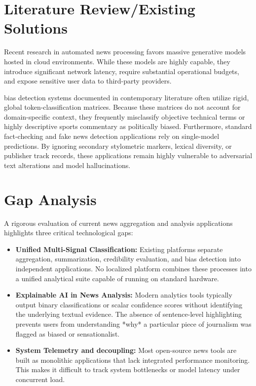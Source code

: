 \section{Literature Review/Existing Solutions}
Recent research in automated news processing favors massive generative models hosted in cloud environments. While these models are highly capable, they introduce significant network latency, require substantial operational budgets, and expose sensitive user data to third-party providers. 

 bias detection systems documented in contemporary literature often utilize rigid, global token-classification matrices. Because these matrices do not account for domain-specific context, they frequently misclassify objective technical terms or highly descriptive sports commentary as politically biased. Furthermore, standard fact-checking and fake news detection applications rely on single-model predictions. By ignoring secondary stylometric markers, lexical diversity, or publisher track records, these applications remain highly vulnerable to adversarial text alterations and model hallucinations.

\section{Gap Analysis}
A rigorous evaluation of current news aggregation and analysis applications highlights three critical technological gaps:
\begin{itemize}
    \item \textbf{Unified Multi-Signal Classification:} Existing platforms separate aggregation, summarization, credibility evaluation, and bias detection into independent applications. No localized platform combines these processes into a unified analytical suite capable of running on standard hardware.
    \item \textbf{Explainable AI in News Analysis:} Modern analytics tools typically output binary classifications or scalar confidence scores without identifying the underlying textual evidence. The absence of sentence-level highlighting prevents users from understanding *why* a particular piece of journalism was flagged as biased or sensationalist.
    \item \textbf{System Telemetry and decoupling:} Most open-source news tools are built as monolithic applications that lack integrated performance monitoring. This makes it difficult to track system bottlenecks or model latency under concurrent load.
\end{itemize}


